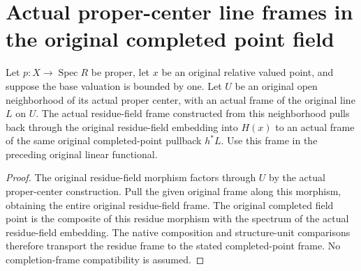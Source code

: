 \section{Actual proper-center line frames in the original completed point field}

\begin{definition}\label{def:fc-point-completed-line-frame}
\leanok
{}
Let $p:X\to\operatorname{Spec}R$ be proper, let $x$ be an original
relative valued point, and suppose the base valuation is bounded by
one. Let $U$ be an original open neighborhood of its actual proper
center, with an actual frame of the original line $L$ on $U$.
The actual residue-field frame constructed from this neighborhood
pulls back through the original residue-field embedding into $H(x)$
to an actual frame of the same original completed-point pullback
$h^*L$. Use this frame in the preceding original linear functional.
\end{definition}
\begin{proof}
The original residue-field morphism factors through $U$ by the actual
proper-center construction. Pull the given original frame along
this morphism, obtaining the entire original residue-field frame.
The original completed field point is the composite of this residue
morphism with the spectrum of the actual residue-field embedding.
The native composition and structure-unit comparisons therefore
transport the residue frame to the stated completed-point frame.
No completion-frame compatibility is assumed.
\end{proof}

